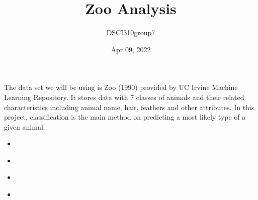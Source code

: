 \documentclass[letterpaper,10pt,english]{jupyterBook}
\title{Zoo Analysis}
\date{Apr 09, 2022}
\author{DSCI310\sphinxhyphen{}group7}
\begin{document}
\pagestyle{empty}
\sphinxmaketitle
\pagestyle{plain}
\sphinxtableofcontents
\pagestyle{normal}
\label{\detokenize{contents::doc}}


\begin{DUlineblock}{0em}
\item[] 
\end{DUlineblock}

\sphinxAtStartPar
The data set we will be using is Zoo (1990) provided by UC Irvine Machine Learning Repository. It stores data with 7 classes of animals and their related characteristics including animal name, hair, feathers and other attributes. In this project, classification is the main method on predicting a most likely type of a given animal.

\sphinxAtStartPar
{}
\begin{itemize}
\item {} 
\sphinxAtStartPar
{\hyperref[\detokenize{intro::doc}]{}}

\item {} 
\sphinxAtStartPar
{\hyperref[\detokenize{analysis::doc}]{}}

\item {} 
\sphinxAtStartPar
{\hyperref[\detokenize{discussion::doc}]{}}

\item {} 
\sphinxAtStartPar
{\hyperref[\detokenize{references::doc}]{}}

\end{itemize}

\sphinxstepscope
\end{document}
